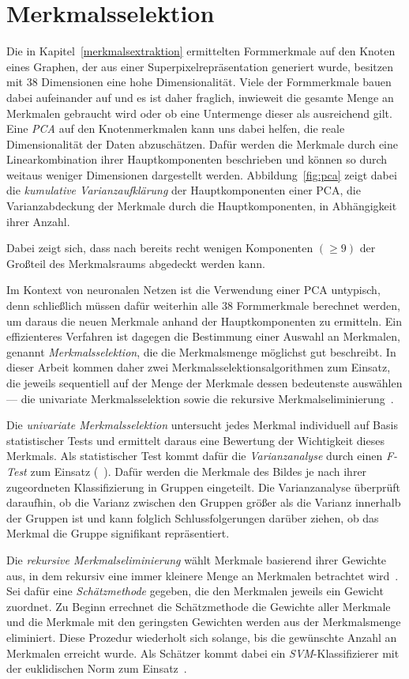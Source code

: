 \section{Merkmalsselektion}
\label{merkmalsselektion}

Die in Kapitel~\ref{merkmalsextraktion} ermittelten Formmerkmale auf den Knoten eines Graphen, der aus einer Superpixelrepräsentation generiert wurde, besitzen mit $38$ Dimensionen eine hohe Dimensionalität.
Viele der Formmerkmale bauen dabei aufeinander auf und es ist daher fraglich, inwieweit die gesamte Menge an Merkmalen gebraucht wird oder ob eine Untermenge dieser als ausreichend gilt.
Eine \emph{\gls{PCA}} auf den Knotenmerkmalen kann uns dabei helfen, die reale Dimensionalität der Daten abzuschätzen.
Dafür werden die Merkmale durch eine Linearkombination ihrer Hauptkomponenten beschrieben und können so durch weitaus weniger Dimensionen dargestellt werden.
Abbildung~\ref{fig:pca} zeigt dabei die \emph{kumulative Varianzaufklärung} der Hauptkomponenten einer \gls{PCA}, \dhe{} die Varianzabdeckung der Merkmale durch die Hauptkomponenten, in Abhängigkeit ihrer Anzahl.

Dabei zeigt sich, dass nach bereits recht wenigen Komponenten $\left(\geq 9\right)$ der Großteil des Merkmalsraums abgedeckt werden kann.

Im Kontext von neuronalen Netzen ist die Verwendung einer \gls{PCA} untypisch, denn schließlich müssen dafür weiterhin alle $38$ Formmerkmale berechnet werden, um daraus die neuen Merkmale anhand der Hauptkomponenten zu ermitteln.
Ein effizienteres Verfahren ist dagegen die Bestimmung einer Auswahl an Merkmalen, genannt \emph{Merkmalsselektion}, die die Merkmalsmenge möglichst gut beschreibt.
In dieser Arbeit kommen daher zwei Merkmalsselektionsalgorithmen zum Einsatz, die jeweils sequentiell auf der Menge der Merkmale dessen bedeutenste auswählen — die univariate Merkmalsselektion sowie die rekursive Merkmalseliminierung~\cite{scikitlearn}.

Die \emph{univariate Merkmalsselektion} untersucht jedes Merkmal individuell auf Basis statistischer Tests und ermittelt daraus eine Bewertung der Wichtigkeit dieses Merkmals.
Als statistischer Test kommt dafür die \emph{Varianzanalyse} durch einen \emph{F-Test} zum Einsatz (\vgl{}~\cite{scikitlearn}).
Dafür werden die Merkmale des Bildes je nach ihrer zugeordneten Klassifizierung in Gruppen eingeteilt.
Die Varianzanalyse überprüft daraufhin, ob die Varianz zwischen den Gruppen größer als die Varianz innerhalb der Gruppen ist und kann folglich Schlussfolgerungen darüber ziehen, ob das Merkmal die Gruppe signifikant repräsentiert.

Die \emph{rekursive Merkmalseliminierung} wählt Merkmale basierend ihrer Gewichte aus, in dem rekursiv eine immer kleinere Menge an Merkmalen betrachtet wird~\cite{scikitlearn}.
Sei dafür eine \emph{Schätzmethode} gegeben, die den Merkmalen jeweils ein Gewicht zuordnet.
Zu Beginn errechnet die Schätzmethode die Gewichte aller Merkmale und die Merkmale mit den geringsten Gewichten werden aus der Merkmalsmenge eliminiert.
Diese Prozedur wiederholt sich solange, bis die gewünschte Anzahl an Merkmalen erreicht wurde.
Als Schätzer kommt dabei ein \emph{\gls{SVM}}-Klassifizierer mit der euklidischen Norm zum Einsatz~\cite{scikitlearn}.
